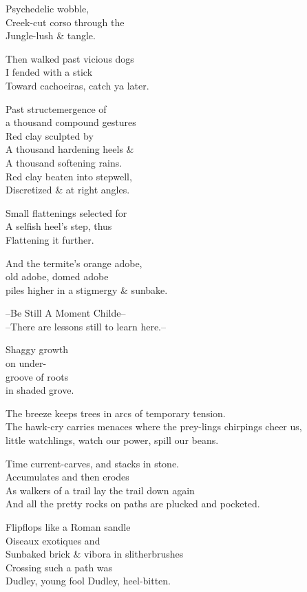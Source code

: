 Psychedelic wobble, \\
Creek-cut corso through the \\
Jungle-lush \& tangle.

Then walked past vicious dogs \\
I fended with a stick \\
Toward cachoeiras, catch ya later.

Past structemergence of \\
a thousand compound gestures \\
Red clay sculpted by \\
A thousand hardening heels \& \\
A thousand softening rains. \\
Red clay beaten into stepwell, \\
Discretized \& at right angles. 

Small flattenings selected for \\
A selfish heel's step, thus \\
Flattening it further.

And the termite's orange adobe, \\
old adobe, domed adobe \\
piles higher in a stigmergy \& sunbake.

\secdiv

--Be Still A Moment Childe-- \\
--There are lessons still to learn here.--

Shaggy growth \\
on under- \\
groove of roots \\
in shaded grove.

The breeze keeps trees in arcs of temporary tension. \\
The hawk-cry carries menaces where the prey-lings chirpings cheer us, \\
little watchlings, watch our power, spill our beans.

Time current-carves, and stacks in stone. \\
Accumulates and then erodes \\
As walkers of a trail lay the trail down again \\
And all the pretty rocks on paths are plucked and pocketed. 

\secdiv

Flipflops like a Roman sandle \\
Oiseaux exotiques and \\
Sunbaked brick \& vibora in slitherbrushes \\
Crossing such a path was \\
Dudley, young fool Dudley, heel-bitten. \\

